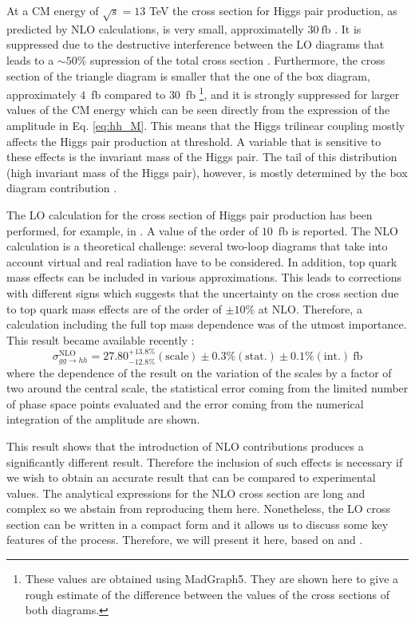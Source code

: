 At a CM energy of $\sqrt{s}=13$ TeV the cross section for Higgs pair production, as predicted by NLO calculations, is very small, approximatelly $30~\text{fb}$ \cite{hhxsNLO}. It is suppressed due to the destructive interference between the LO diagrams that leads to a $\sim 50\%$ supression of the total cross section \cite{FCCyellow}. Furthermore, the cross section of the triangle diagram is smaller that the one of the box diagram, approximately $4$~fb compared to $30$~fb \footnote{These values are obtained using MadGraph5. They are shown here to give a rough estimate of the difference between the values of the cross sections  of both diagrams.}, and it is strongly suppressed for larger values of the CM energy which can be seen directly from the expression of the amplitude in Eq. \ref{eq:hh_M}. This means that the Higgs trilinear coupling mostly affects the Higgs pair production at threshold. A variable that is sensitive to these effects is the invariant mass of the Higgs pair. The tail of this distribution (high invariant mass of the Higgs pair), however, is mostly determined by the box diagram contribution \cite{FCCyellow}.  

The LO calculation for the cross section of Higgs pair production has been performed, for example, in \cite{HHxs_LO}. A value of the order of $10$~fb is reported. The NLO calculation is a theoretical challenge: several two-loop diagrams that take into account virtual and real radiation have to be considered. In addition, top quark mass effects can be included in various approximations. This leads to corrections with different signs which suggests that the uncertainty on the cross section due to top quark mass effects are of the order of $\pm 10\%$ at NLO. Therefore, a calculation including the full top mass dependence was of the utmost importance. This result became available recently \cite{HHcalc_top}:
\begin{equation}
\sigma^{\text{NLO}}_{gg\rightarrow hh} = 27.80^{+13.8\%}_{-12.8\%}(\text{scale})\pm 0.3\%(\text{stat.})\pm 0.1\% (\text{int.})~\text{fb}
\end{equation}
where the dependence of the result on the variation of the scales by a factor of two around the central scale, the statistical error coming from the limited number of phase space points evaluated and the error coming from the numerical integration of the amplitude are shown. 

This result shows that the introduction of NLO contributions produces a significantly different result. Therefore the inclusion of such effects is necessary if we wish to obtain an accurate result that can be compared to experimental values. The analytical expressions for the NLO cross section are long and complex so we abstain from reproducing them here. Nonetheless, the LO cross section can be written in a compact form and it allows us to discuss some key features of the process. Therefore, we will present it here, based on \cite{HHxs_LO} and \cite{HHxs_LO1}.

